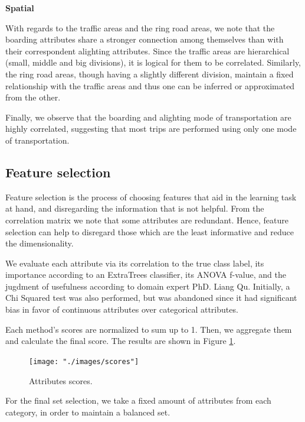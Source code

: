 \documentclass{article}
\begin{document}
\textbf{Spatial}

With regards to the traffic areas and the ring road areas, we note that the boarding attributes share a stronger connection among themselves than with their correspondent alighting attributes. Since the traffic areas are hierarchical (small, middle and big divisions), it is logical for them to be correlated. Similarly, the ring road areas, though having a slightly different division, maintain a fixed relationship with the traffic areas and thus one can be inferred or approximated from the other. 

Finally, we observe that the boarding and alighting mode of transportation are highly correlated, suggesting that most trips are performed using only one mode of transportation. 

\subsection{Feature selection}
Feature selection is the process of choosing features that aid in the learning task at hand, and disregarding the information that is not helpful. From the correlation matrix we note that some attributes are redundant. Hence, feature selection can help to disregard those which are the least informative and reduce the dimensionality.

We evaluate each attribute via its correlation to the true class label, its importance according to an ExtraTrees classifier, its ANOVA f-value, and the jugdment of usefulness according to domain expert PhD. Liang Qu. Initially, a Chi Squared test was also performed, but was abandoned since it had significant bias in favor of continuous attributes over categorical attributes. 

Each method's scores are normalized to sum up to 1. Then, we aggregate them and calculate the final score. The results are shown in Figure \ref{fig:classification/scores}. 

\begin{figure}[H]
  \centering
  \texttt{[image: "./images/scores"]}
  \caption{Attributes scores.}
  \label{fig:classification/scores}
\end{figure}

For the final set selection, we take a fixed amount of attributes from each category, in order to maintain a balanced set. 
\end{document}
